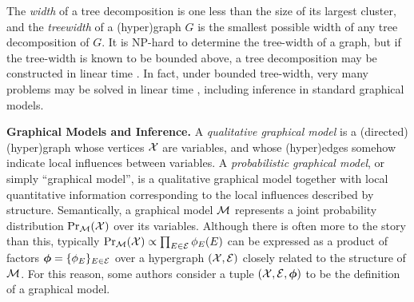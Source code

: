 \documentclass[twoside]{article}
\begin{document}
The \emph{width} of a tree decomposition is one less than the size of its largest cluster,
and the \emph{treewidth} of a (hyper)graph $G$ is the smallest possible width of any tree decomposition of $G$.
It is NP-hard to determine the tree-width of a graph, but if the tree-width is known to be bounded above, a tree decomposition may be constructed in linear time \parencite{bodlaender1993linear}.
In fact, under bounded tree-width, very many problems may be solved in linear time \parencite{courcelle1990}, including inference in standard graphical models. 


\textbf{Graphical Models and Inference.}
A \emph{qualitative graphical model} 
is a (directed) (hyper)graph whose vertices $\mathcal X$ are variables, and whose (hyper)edges somehow indicate local influences between variables.
A \emph{probabilistic graphical model}, 
or simply  ``graphical model'',
is a
qualitative graphical model
together with local quantitative information corresponding to the local influences described by structure.
%
Semantically,
a graphical model $\cal M$
represents a joint probability distribution $\Pr_{\cal M}(\mathcal X)$ over its variables.
Although there is often more to the story than this, 
typically
%
$\Pr_{\cal M}(\mathcal X) \propto \prod_{E \in \mathcal E} \phi_{E}(E)$
can be expressed as a product of factors
$\boldsymbol\phi = \{ \phi_E \}_{E \in \mathcal E}$
over a hypergraph $(\mathcal X, \mathcal E)$ closely related to the structure of $\cal M$.
For this reason, some authors consider a tuple
$(\mathcal X ,\mathcal E, \boldsymbol\phi)$
to be the definition of a graphical model.
\end{document}
